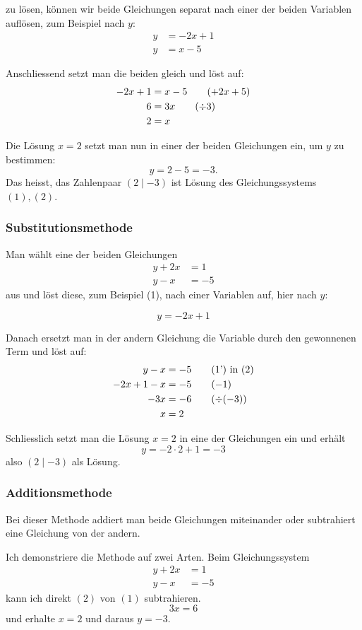 \documentclass[%
11pt,%
twoside,%
titlepage,%
swissgerman,%
headsepline%
]{scrartcl}
\theoremstyle{definition}
\theoremstyle{plain}
\begin{document}
zu lösen, können wir beide Gleichungen separat nach einer der beiden Variablen auflösen, zum Beispiel nach $y$:
\begin{align}
y&=-2x+1\tag{$1'$}\\
y&=x-5\tag{$2'$}
\end{align}

Anschliessend setzt man die beiden gleich und löst auf:
\begin{align}
-2x+1&=x-5\tag{$+2x+5$}\\
6&=3x\tag{$\div3$}\\
2&=x\notag
\end{align}

Die Lösung $x=2$ setzt man nun in einer der beiden Gleichungen ein, um $y$ zu bestimmen:
$$y=2-5=-3.$$
Das heisst, das Zahlenpaar $(2\mid -3)$ ist Lösung des Gleichungssystems $(1), (2)$.

\subsubsection{Substitutionsmethode}
Man wählt eine der beiden Gleichungen
\begin{align}
y+2x&=1\tag{1}\\
y-x&=-5\tag{2}
\end{align}
aus und löst diese, zum Beispiel (1), nach einer Variablen auf, hier nach $y$:

\begin{equation}
y=-2x+1\tag{1'}
\end{equation}

Danach ersetzt man in der andern Gleichung die Variable durch den gewonnenen Term und löst auf:
\begin{align}
y-x&=-5\tag{1') in (2}\\
-2x+1-x&=-5\tag{$-1$}\\
-3x&=-6\tag{$\div(-3)$}\\
x&=2\notag
\end{align}

Schliesslich setzt man die Lösung $x=2$ in eine der Gleichungen ein und erhält
$$y=-2\cdot 2+1=-3$$
also $(2\mid -3)$ als Lösung.

\subsubsection{Additionsmethode}
Bei dieser Methode addiert man beide Gleichungen miteinander oder subtrahiert eine Gleichung von der andern.

Ich demonstriere die Methode auf zwei Arten. Beim Gleichungssystem
\begin{align}
y+2x&=1\tag{1}\\
y-x&=-5\tag{2}
\end{align}
kann ich direkt $(2)$ von $(1)$ subtrahieren.
\begin{equation}
3x=6\tag{$2)-(1$}
\end{equation}
und erhalte $x=2$ und daraus $y=-3$.
\end{document}
